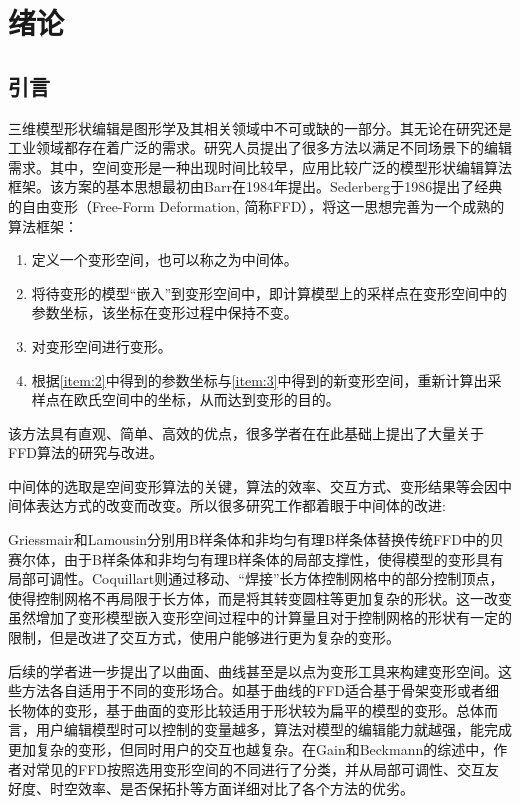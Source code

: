 
\chapter{绪论}
\section{引言}
三维模型形状编辑是图形学及其相关领域中不可或缺的一部分。其无论在研究还是工业领域都存在着广泛的需求。研究人员提出了很多方法以满足不同场景下的编辑需求。其中，空间变形是一种出现时间比较早，应用比较广泛的模型形状编辑算法框架。该方案的基本思想最初由Barr\cite{Barr84}在1984年提出。Sederberg\cite{Sederberg86}于1986提出了经典的自由变形（Free-Form Deformation, 简称FFD），将这一思想完善为一个成熟的算法框架：
\begin{enumerate}
	\item 定义一个变形空间，也可以称之为中间体。
    \item 将待变形的模型“嵌入”到变形空间中，即计算模型上的采样点在变形空间中的参数坐标，该坐标在变形过程中保持不变。\label{item:2}
	\item 对变形空间进行变形。\label{item:3}
    \item 根据\ref{item:2}中得到的参数坐标与\ref{item:3}中得到的新变形空间，重新计算出采样点在欧氏空间中的坐标，从而达到变形的目的。
\end{enumerate}

该方法具有直观、简单、高效的优点，很多学者在在此基础上提出了大量关于FFD算法的研究与改进。

中间体的选取是空间变形算法的关键，算法的效率、交互方式、变形结果等会因中间体表达方式的改变而改变。所以很多研究工作都着眼于中间体的改进:

Griessmair\cite{Griessmair89}和Lamousin\cite{lamousin1994}分别用B样条体和非均匀有理B样条体替换传统FFD\cite{Sederberg86}中的贝赛尔体，由于B样条体和非均匀有理B样条体的局部支撑性，使得模型的变形具有局部可调性。Coquillart\cite{coquillart1990}则通过移动、“焊接”长方体控制网格中的部分控制顶点，使得控制网格不再局限于长方体，而是将其转变圆柱等更加复杂的形状。这一改变虽然增加了变形模型嵌入变形空间过程中的计算量且对于控制网格的形状有一定的限制，但是改进了交互方式，使用户能够进行更为复杂的变形。

后续的学者进一步提出了以曲面、曲线甚至是以点为变形工具来构建变形空间。这些方法各自适用于不同的变形场合。如基于曲线的FFD适合基于骨架变形或者细长物体的变形，基于曲面的变形比较适用于形状较为扁平的模型的变形。总体而言，用户编辑模型时可以控制的变量越多，算法对模型的编辑能力就越强，能完成更加复杂的变形，但同时用户的交互也越复杂。在Gain和Beckmann的综述\cite{Gain08}中，作者对常见的FFD按照选用变形空间的不同进行了分类，并从局部可调性、交互友好度、时空效率、是否保拓扑等方面详细对比了各个方法的优劣。

